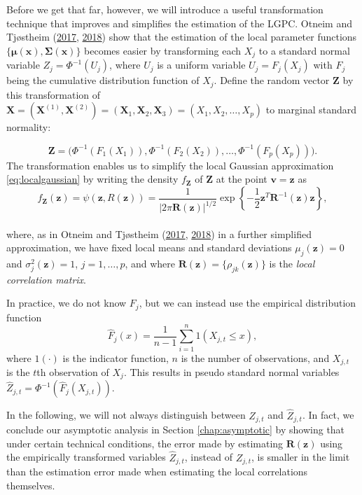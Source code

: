 \documentclass[
  12pt,
  letterpaper]{article}
\newcommand{\X}{\bm{X}}
\newcommand{\Xone}{\bm{X}^{(1)}}
\newcommand{\Xtwo}{\bm{X}^{(2)}}
\newcommand{\x}{\bm{x}}
\newcommand{\Z}{\bm{Z}}
\newcommand{\z}{\bm{z}}
\newcommand{\fv}{\bm{v}}
\newcommand{\R}{\bm{R}}
\newcommand{\fmu}{\bm{\mu}}
\newcommand{\fSigma}{\bm{\Sigma}}
\theoremstyle{definition}
\theoremstyle{definition}
\theoremstyle{definition}
\theoremstyle{remark}
\begin{document}
Before we get that far, however, we will introduce a useful transformation technique that improves and simplifies the estimation of the LGPC. Otneim and Tjøstheim (\protect\hyperlink{ref-otneim2017locally}{2017}, \protect\hyperlink{ref-otneim2017conditional}{2018}) show that the estimation of the local parameter functions \(\{\fmu(\x), \fSigma(\x)\}\) becomes easier by transforming each \(X_j\) to a standard normal variable \(Z_j = \Phi^{-1}(U_j)\), where \(U_j\) is a uniform variable \(U_j = F_{j}(X_j)\) with \(F_{j}\) being the cumulative distribution function of \(X_j\). Define the random vector \(\Z\) by this transformation of \(\X = (\Xone, \Xtwo) = (\X_1, \X_2, \X_3) = (X_1, X_2, \ldots, X_p)\) to marginal standard normality:

\begin{equation}
\Z = \Big(\Phi^{-1}\left(F_{1}(X_1)\right), \Phi^{-1}\left(F_{2}(X_2)\right), \ldots, \Phi^{-1}\left(F_{p}(X_p)\right)\Big).
\label{eq:trans}
\end{equation}
The transformation enables us to simplify the local Gaussian approximation \eqref{eq:localgaussian} by writing the density \(f_{\Z}\) of \(\Z\) at the point \(\fv = \z\) as
\begin{equation}
f_{\Z}(\z) = \psi(\z, R(\z)) = \frac{1}{|2\pi\R(\z)|^{1/2}}\exp\left\{-\frac{1}{2}\z^T\R^{-1}(\z)\z\right\},
\label{eq:lgdeapprox}
\end{equation}\\
where, as in Otneim and Tjøstheim (\protect\hyperlink{ref-otneim2017locally}{2017}, \protect\hyperlink{ref-otneim2017conditional}{2018}) in a further simplified approximation, we have fixed local means and standard deviations \(\mu_j(\z) = 0\) and \(\sigma_j^2(\z) = 1\), \(j = 1,\ldots,p\), and where \(\R(\z) = \{\rho_{jk}(\z)\}\) is the \emph{local correlation matrix}.

In practice, we do not know \(F_{j}\), but we can instead use the empirical distribution function
\[\widehat F_{j}(x) = \frac{1}{n-1}\sum_{i=1}^n 1\left(X_{j,t} \leq x\right),\]
where \(1(\cdot)\) is the indicator function, \(n\) is the number of observations, and \(X_{j,t}\) is the \(t\)th observation of \(X_{j}\). This results in pseudo standard normal variables \(\widehat Z_{j,t} = \Phi^{-1}(\widehat F_{j}(X_{j,t}))\).

In the following, we will not always distinguish between \(Z_{j,t}\) and \(\widehat Z_{j,t}\). In fact, we conclude our asymptotic analysis in Section \ref{chap:asymptotic} by showing that under certain technical conditions, the error made by estimating \(\R(\z)\) using the empirically transformed variables \(\widehat Z_{j,t}\), instead of \(Z_{j,t}\), is smaller in the limit than the estimation error made when estimating the local correlations themselves.
\end{document}
